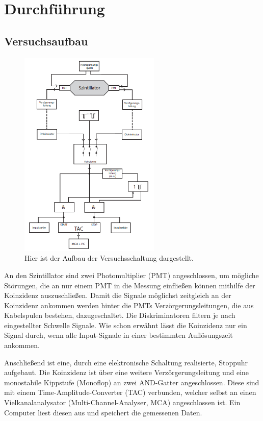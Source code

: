 \newpage
\section{Durchführung}
    \subsection{Versuchsaufbau}
        \begin{figure}[h]
          \centering
          \includegraphics[width = 0.6\textwidth]{pictures/Aufbau.png}
          \caption{Hier ist der Aufbau der Versuchsschaltung dargestellt.}
          \label{fig:Aufbau}
        \end{figure}

        \FloatBarrier

        An den Szintillator sind zwei Photomultiplier (PMT) angeschlossen, um mögliche Störungen, die an nur einem PMT in die Messung einfließen können mithilfe der Koinzidenz auszuschließen.
        Damit die Signale möglichst zeitgleich an der Koinzidenz ankommen werden hinter die PMTs Verzörgerungsleitungen, die aus Kabelspulen bestehen, dazugeschaltet.
        Die Diskriminatoren filtern je nach eingestellter Schwelle Signale.
        Wie schon erwähnt lässt die Koinzidenz nur ein Signal durch, wenn alle Input-Signale in einer bestimmten Auflösungszeit ankommen.

        Anschließend ist eine, durch eine elektronische Schaltung realisierte, Stoppuhr aufgebaut. Die Koinzidenz ist über eine weitere Verzörgerungsleitung und eine monostabile Kippstufe (Monoflop) an zwei AND-Gatter angeschlossen. Diese sind mit einem Time-Amplitude-Converter (TAC) verbunden, welcher selbst an einen Vielkanalanalysator (Multi-Channel-Analyser, MCA) angeschlossen ist. Ein Computer liest diesen aus und speichert die gemessenen Daten.


